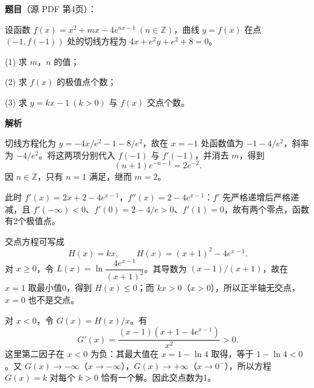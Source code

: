 \begin{answer}

\textbf{题目}（源 PDF 第4页）：

设函数 \(f(x)=x^2+mx-4e^{nx-1}\ (n\in\mathbb{Z})\)，曲线 \(y=f(x)\) 在点 \((-1,f(-1))\) 处的切线方程为 \(4x+e^2y+e^2+8=0\)。

(1) 求 \(m\text{，}n\) 的值；

(2) 求 \(f(x)\) 的极值点个数；

(3) 求 \(y=kx-1\ (k>0)\) 与 \(f(x)\) 交点个数。

\textbf{解析}


切线方程化为 \(y=-4x/e^2-1-8/e^2\)，故在 \(x=-1\) 处函数值为 \(-1-4/e^2\)，斜率为 \(-4/e^2\)。将这两项分别代入 \(f(-1)\) 与 \(f'(-1)\)，并消去 \(m\)，得到
\nopagebreak[4]
\[
(n+1)e^{-n-1}=2e^{-2}.
\]
因 \(n\in\mathbb Z\)，只有 \(n=1\) 满足，继而 \(m=2\)。


此时 \(f'(x)=2x+2-4e^{x-1}\)，\(f''(x)=2-4e^{x-1}\)：\(f'\) 先严格递增后严格递减，且 \(f'(-\infty)<0\)、\(f'(0)=2-4/e>0\)、\(f'(1)=0\)，故有两个零点，函数有2个极值点。


交点方程可写成
\nopagebreak[4]
\[
H(x)=kx,\qquad H(x)=(x+1)^2-4e^{x-1}.
\]
对 \(x\ge0\)，令 \(L(x)=\ln\dfrac{4e^{x-1}}{(x+1)^2}\)。其导数为 \((x-1)/(x+1)\)，故在 \(x=1\) 取最小值0，得到 \(H(x)\le0\)；而 \(kx>0\)（\(x>0\)），所以正半轴无交点，\(x=0\) 也不是交点。

对 \(x<0\)，令 \(G(x)=H(x)/x\)。有
\nopagebreak[4]
\[
G'(x)=\frac{(x-1)(x+1-4e^{x-1})}{x^2}>0.
\]
这里第二因子在 \(x<0\) 为负：其最大值在 \(x=1-\ln4\) 取得，等于 \(1-\ln4<0\)。又 \(G(x)\to-\infty\)（\(x\to-\infty\)），\(G(x)\to+\infty\)（\(x\to0^-\)），所以方程 \(G(x)=k\) 对每个 \(k>0\) 恰有一个解。因此交点数为1。




\end{answer}
